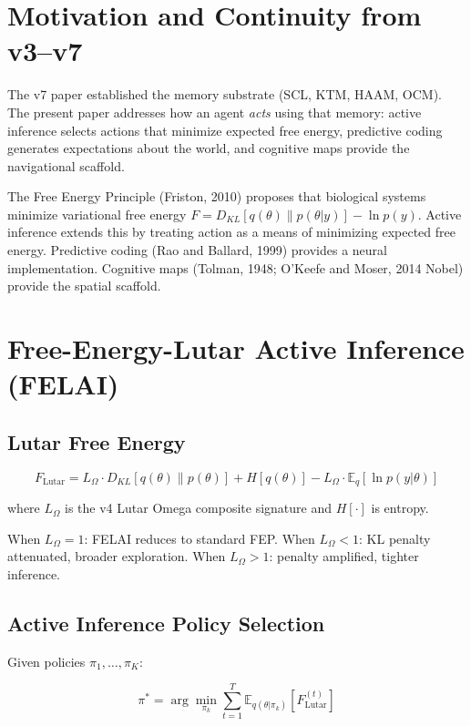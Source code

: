 \documentclass[11pt]{article}
\theoremstyle{plain}
\begin{document}
\section{Motivation and Continuity from v3–v7}

The v7 paper established the memory substrate (SCL, KTM, HAAM, OCM). The present paper addresses how an agent \emph{acts} using that memory: active inference selects actions that minimize expected free energy, predictive coding generates expectations about the world, and cognitive maps provide the navigational scaffold.

The Free Energy Principle (Friston, 2010) proposes that biological systems minimize variational free energy \( F = D_{KL}[q(\theta) \| p(\theta | y)] - \ln p(y) \). Active inference extends this by treating action as a means of minimizing expected free energy. Predictive coding (Rao and Ballard, 1999) provides a neural implementation. Cognitive maps (Tolman, 1948; O'Keefe and Moser, 2014 Nobel) provide the spatial scaffold.


\section{Free-Energy-Lutar Active Inference (FELAI)}

\subsection{Lutar Free Energy}

\begin{equation}
F_{\text{Lutar}} = L_\Omega \cdot D_{KL}[q(\theta) \| p(\theta)] + H[q(\theta)] - L_\Omega \cdot \mathbb{E}_q[\ln p(y | \theta)]
\end{equation}

where \( L_\Omega \) is the v4 Lutar Omega composite signature and \( H[\cdot] \) is entropy.

When \( L_\Omega = 1 \): FELAI reduces to standard FEP. When \( L_\Omega < 1 \): KL penalty attenuated, broader exploration. When \( L_\Omega > 1 \): penalty amplified, tighter inference.

\subsection{Active Inference Policy Selection}

Given policies \( \pi_1, \ldots, \pi_K \):

\begin{equation}
\pi^* = \arg\min_{\pi_k} \sum_{t=1}^{T} \mathbb{E}_{q(\theta|\pi_k)}\left[ F_{\text{Lutar}}^{(t)} \right]
\end{equation}
\end{document}
